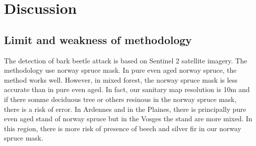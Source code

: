 \documentclass[3p,procedia]{elsarticle}
\begin{document}

 
  




\section{Discussion}


\subsection{Limit and weakness of methodology}
The detection of bark beetle attack is based on Sentinel 2 satellite imagery.
The methodology use norway spruce mask. 
In pure even aged norway spruce, the method works well. 
However, in mixed forest, the norway spruce mask is less accurate than in pure even aged.
In fact, our sanitary map resolution is 10m and if there somme deciduous tree or others resinous in the norway spruce mask, there is a risk of error.
In Ardennes and in the Plaines, there is principally pure even aged stand of norway spruce but in the Vosges the stand are more mixed.
In this region, there is more risk of presence of beech and silver fir in our norway spruce mask.
\end{document}
